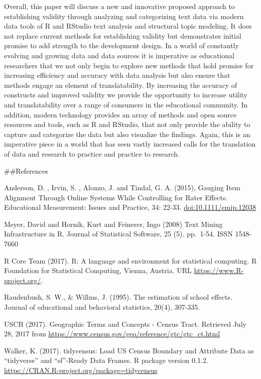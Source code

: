 \documentclass[doc]{apa6}
\theoremstyle{definition}
\theoremstyle{definition}
\theoremstyle{definition}
\theoremstyle{remark}
\begin{document}
Overall, this paper will discuss a new and innovative proposed approach
to establishing validity through analyzing and categorizing text data
via modern data tools of R and RStudio text analysis and structural
topic modeling. It does not replace current methods for establishing
validity but demonstrates initial promise to add strength to the
development design. In a world of constantly evolving and growing data
and data sources it is imperative as educational researchers that we not
only begin to explore new methods that hold promise for increasing
efficiency and accuracy with data analysis but also ensure that methods
engage an element of translatability. By increasing the accuracy of
constructs and improved validity we provide the opportunity to increase
utility and translatability over a range of consumers in the educational
community. In addition, modern technology provides an array of methods
and open source resources and tools, such as R and RStudio, that not
only provide the ability to capture and categorize the data but also
visualize the findings. Again, this is an imperative piece in a world
that has seen vastly increased calls for the translation of data and
research to practice and practice to research.

\#\#References

Anderson, D. , Irvin, S. , Alonzo, J. and Tindal, G. A. (2015), Gauging
Item Alignment Through Online Systems While Controlling for Rater
Effects. Educational Measurement: Issues and Practice, 34: 22-33.
\url{doi:10.1111/emip.12038}

Meyer, David and Hornik, Kurt and Feinerer, Ingo (2008) Text Mining
Infrastructure in R. Journal of Statistical Software, 25 (5). pp.~1-54.
ISSN 1548-7660

R Core Team (2017). R: A language and environment for statistical
computing. R Foundation for Statistical Computing, Vienna, Austria. URL
\url{https://www.R-project.org/}.

Raudenbush, S. W., \& Willms, J. (1995). The estimation of school
effects. Journal of educational and behavioral statistics, 20(4),
307-335.

USCB (2017). Geographic Terms and Concepts - Census Tract. Retrieved
July 28, 2017 from
\url{https://www.census.gov/geo/reference/gtc/gtc_ct.html}

Walker, K. (2017). tidycensus: Load US Census Boundary and Attribute
Data as \enquote{tidyverse} and \enquote{sf}-Ready Data Frames. R
package version 0.1.2.
\url{https://CRAN.R-project.org/package=tidycensus}
\end{document}
